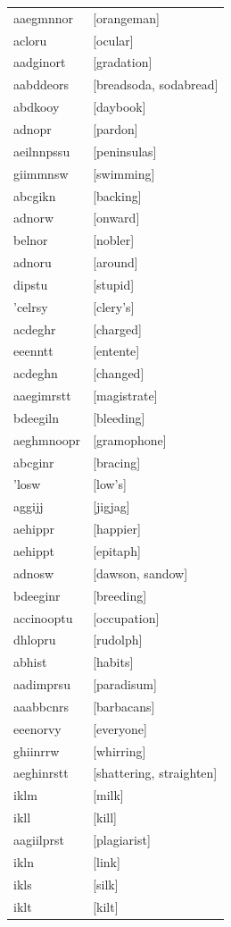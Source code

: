 \documentclass{article}
\begin{document}
\begin{tabular}{ll}
aaegmnnor & [orangeman] \\
acloru & [ocular] \\
aadginort & [gradation] \\
aabddeors & [breadsoda, sodabread] \\
abdkooy & [daybook] \\
adnopr & [pardon] \\
aeilnnpssu & [peninsulas] \\
giimmnsw & [swimming] \\
abcgikn & [backing] \\
adnorw & [onward] \\
belnor & [nobler] \\
adnoru & [around] \\
dipstu & [stupid] \\
'celrsy & [clery's] \\
acdeghr & [charged] \\
eeenntt & [entente] \\
acdeghn & [changed] \\
aaegimrstt & [magistrate] \\
bdeegiln & [bleeding] \\
aeghmnoopr & [gramophone] \\
abcginr & [bracing] \\
'losw & [low's] \\
aggijj & [jigjag] \\
aehippr & [happier] \\
aehippt & [epitaph] \\
adnosw & [dawson, sandow] \\
bdeeginr & [breeding] \\
accinooptu & [occupation] \\
dhlopru & [rudolph] \\
abhist & [habits] \\
aadimprsu & [paradisum] \\
aaabbcnrs & [barbacans] \\
eeenorvy & [everyone] \\
ghiinrrw & [whirring] \\
aeghinrstt & [shattering, straighten] \\
iklm & [milk] \\
ikll & [kill] \\
aagiilprst & [plagiarist] \\
ikln & [link] \\
ikls & [silk] \\
iklt & [kilt] \\

\end{tabular}
\end{document}

